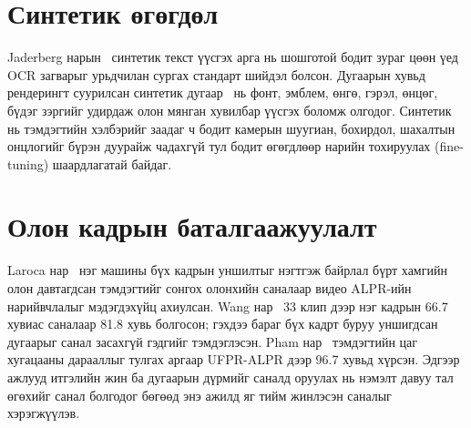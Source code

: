 \section{Синтетик өгөгдөл}
Jaderberg нарын~\cite{jaderberg2014} синтетик текст үүсгэх арга нь шошготой бодит зураг цөөн үед OCR загварыг урьдчилан сургах стандарт шийдэл болсон. Дугаарын хувьд рендерингт суурилсан синтетик дугаар~\cite{ruder2022} нь фонт, эмблем, өнгө, гэрэл, өнцөг, бүдэг зэргийг удирдаж олон мянган хувилбар үүсгэх боломж олгодог. Синтетик нь тэмдэгтийн хэлбэрийг заадаг ч бодит камерын шуугиан, бохирдол, шахалтын онцлогийг бүрэн дуурайж чадахгүй тул бодит өгөгдлөөр нарийн тохируулах (fine-tuning) шаардлагатай байдаг.

\section{Олон кадрын баталгаажуулалт}
Laroca нар~\cite{laroca2018} нэг машины бүх кадрын уншилтыг нэгтгэж байрлал бүрт хамгийн олон давтагдсан тэмдэгтийг сонгох олонхийн саналаар видео ALPR-ийн нарийвчлалыг мэдэгдэхүйц ахиулсан. Wang нар~\cite{wang2026mt} 33 клип дээр нэг кадрын 66.7 хувиас саналаар 81.8 хувь болгосон; гэхдээ бараг бүх кадрт буруу уншигдсан дугаарыг санал засахгүй гэдгийг тэмдэглэсэн. Pham нар~\cite{pham2023ctsm} тэмдэгтийн цаг хугацааны дарааллыг тулгах аргаар UFPR-ALPR дээр 96.7 хувьд хүрсэн. Эдгээр ажлууд итгэлийн жин ба дугаарын дүрмийг саналд оруулах нь нэмэлт давуу тал өгөхийг санал болгодог бөгөөд энэ ажилд яг тийм жинлэсэн саналыг хэрэгжүүлэв.

